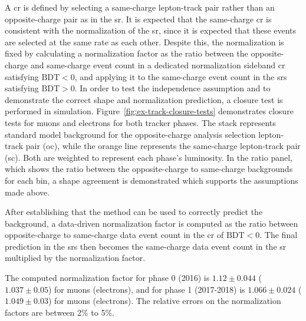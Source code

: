 A \gls{cr} is defined by selecting a same-charge lepton-track pair rather than an opposite-charge pair as in the \gls{sr}. It is expected that the same-charge \gls{cr} is consistent with the normalization of the \gls{sr}, since it is expected that these events are selected at the same rate as each other. Despite this, the normalization is fixed by calculating a normalization factor as the ratio between the opposite-charge and same-charge event count in a dedicated normalization sideband \gls{cr} satisfying $\text{BDT} < 0$, and applying it to the same-charge event count in the \glspl{sr} satisfying $\text{BDT} > 0$. In order to test the independence assumption and to demonstrate the correct shape and normalization prediction, a closure test is performed in simulation. Figure~\ref{fig:ex-track-closure-tests} demonstrates closure tests for muons and electrons for both tracker phases. The stack represents standard model background for the opposite-charge analysis selection lepton-track pair (oc), while the orange line represents the same-charge lepton-track pair (sc). Both are weighted to represent each phase's luminosity. In the ratio panel, which shows the ratio between the opposite-charge to same-charge backgrounds for each bin, a shape agreement is demonstrated which supports the assumptions made above.

After establishing that the method can be used to correctly predict the background, a data-driven normalization factor is computed as the ratio between opposite-charge to same-charge data event count in the \gls{cr} of $\text{BDT} < 0$. The final prediction in the \glspl{sr} then becomes the same-charge data event count in the \gls{sr} multiplied by the normalization factor.

The computed normalization factor for phase 0 (2016) is $1.12\pm 0.044$ ($1.037\pm 0.05$) for muons (electrons), and for phase 1 (2017-2018) is $1.066\pm 0.024$ ($1.049\pm 0.03$) for muons (electrons). The relative errors on the normalization factors are between 2\% to 5\%.


